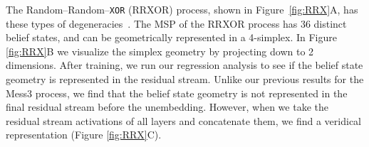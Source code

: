 \documentclass{article}
\begin{document}

The Random--Random--\texttt{XOR} (RRXOR) process, shown in Figure~\ref{fig:RRX}A,  has these types of degeneracies~\cite{Riec18_SSAC2}. The MSP of the RRXOR process has 36 distinct belief states, and can be geometrically represented in a 4-simplex. In Figure \ref{fig:RRX}B we visualize the simplex geometry by projecting down to 2 dimensions. After training, we run our regression analysis to see if the belief state geometry is represented in the residual stream. Unlike our previous results for the Mess3 process, we find that the belief state geometry is not represented in the final residual stream before the unembedding. However, when we take the residual stream activations of all layers and concatenate them, we find a veridical representation (Figure \ref{fig:RRX}C).
\end{document}
